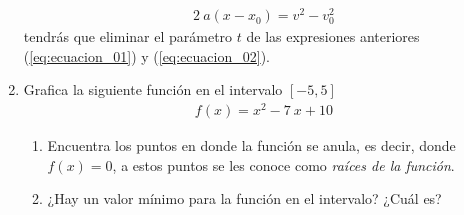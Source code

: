 \documentclass[12pt]{article}
\begin{document}
\begin{enumerate}
\begin{align*}
2 \: a ( x - x_{0}) = v^{2} - v_{0}^{2} 
\end{align*}
tendrás que eliminar el parámetro $t$ de las expresiones anteriores (\ref{eq:ecuacion_01}) y (\ref{eq:ecuacion_02}).
\item Grafica la siguiente función en el intervalo $[-5, 5]$
\begin{align*}
f(x) = x^{2} - 7 \: x + 10
\end{align*}
\begin{enumerate}
\item Encuentra los puntos en donde la función se anula, es decir, donde $f(x)=0$, a estos puntos se les conoce como \emph{raíces de la función}.
\item ¿Hay un valor mínimo para la función en el intervalo? ¿Cuál es?
\end{enumerate}
\end{enumerate} 
\end{document}
